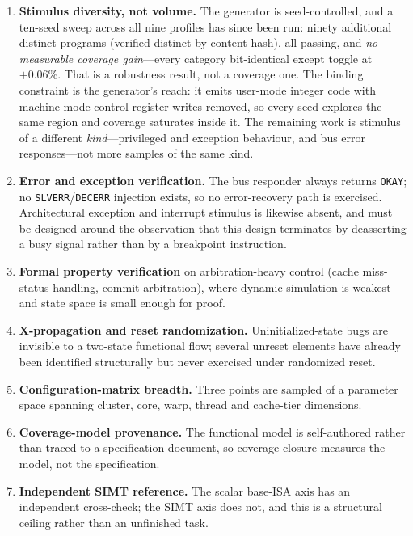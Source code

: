 \documentclass[conference]{IEEEtran}
\begin{document}
\begin{enumerate}
\item \textbf{Stimulus diversity, not volume.} The generator is
seed-controlled, and a ten-seed sweep across all nine profiles has since been
run: ninety additional distinct programs (verified distinct by content hash),
all passing, and \emph{no measurable coverage gain}---every category
bit-identical except toggle at $+0.06\%$. That is a robustness result, not a
coverage one. The binding constraint is the generator's reach: it emits
user-mode integer code with machine-mode control-register writes removed, so
every seed explores the same region and coverage saturates inside it. The
remaining work is stimulus of a different \emph{kind}---privileged and
exception behaviour, and bus error responses---not more samples of the same
kind.
\item \textbf{Error and exception verification.} The bus responder
always returns \texttt{OKAY}; no \texttt{SLVERR}/\texttt{DECERR}
injection exists, so no error-recovery path is exercised. Architectural
exception and interrupt stimulus is likewise absent, and must be designed
around the observation that this design terminates by deasserting a busy
signal rather than by a breakpoint instruction.
\item \textbf{Formal property verification} on arbitration-heavy control
(cache miss-status handling, commit arbitration), where dynamic
simulation is weakest and state space is small enough for proof.
\item \textbf{X-propagation and reset randomization.} Uninitialized-state
bugs are invisible to a two-state functional flow; several unreset
elements have already been identified structurally but never exercised
under randomized reset.
\item \textbf{Configuration-matrix breadth.} Three points are sampled of
a parameter space spanning cluster, core, warp, thread and cache-tier
dimensions.
\item \textbf{Coverage-model provenance.} The functional model is
self-authored rather than traced to a specification document, so
coverage closure measures the model, not the specification.
\item \textbf{Independent SIMT reference.} The scalar base-ISA axis has
an independent cross-check; the SIMT axis does not, and this is a
structural ceiling rather than an unfinished task.
\end{enumerate}
\end{document}
